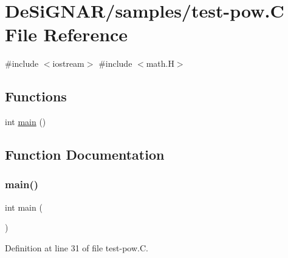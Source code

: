 \hypertarget{test-pow_8_c}{}\section{De\+Si\+G\+N\+A\+R/samples/test-\/pow.C File Reference}
\label{test-pow_8_c}
{\ttfamily \#include $<$iostream$>$}\newline
{\ttfamily \#include $<$math.\+H$>$}\newline
\subsection*{Functions}
\begin{DoxyCompactItemize}
\item 
int \hyperlink{test-pow_8_c_ae66f6b31b5ad750f1fe042a706a4e3d4}{main} ()
\end{DoxyCompactItemize}


\subsection{Function Documentation}
\mbox{\label{test-pow_8_c_ae66f6b31b5ad750f1fe042a706a4e3d4}} 
\subsubsection{\texorpdfstring{main()}{main()}}
{\footnotesize\ttfamily int main (\begin{DoxyParamCaption}{ }\end{DoxyParamCaption})}



Definition at line 31 of file test-\/pow.\+C.

